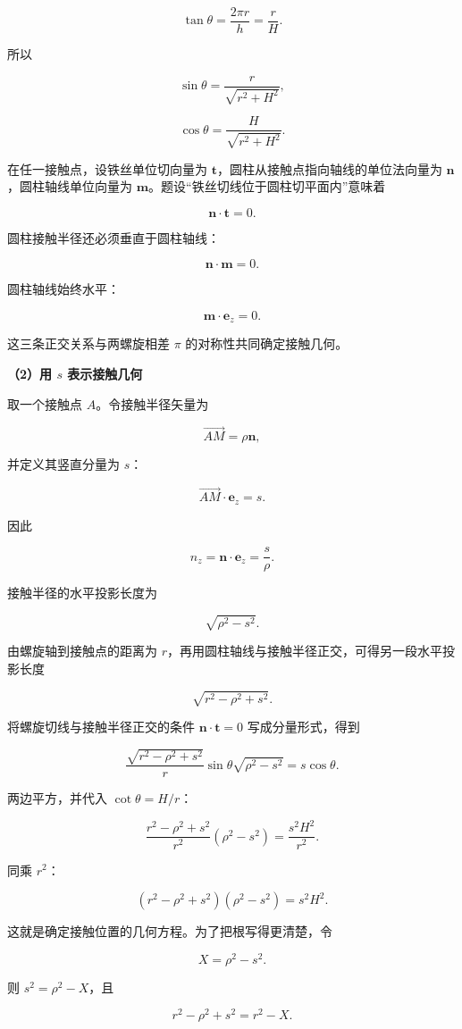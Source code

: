 \documentclass[12pt,a4paper,UTF8]{ctexart}
\begin{document}
\[\tan\theta=\frac{2\pi r}{h}=\frac rH.\]

所以

\[\sin\theta=\frac r{\sqrt{r^2+H^2}},\]

\[\cos\theta=\frac H{\sqrt{r^2+H^2}}.\]

在任一接触点，设铁丝单位切向量为
\(\bm t\)，圆柱从接触点指向轴线的单位法向量为
\(\bm n\)，圆柱轴线单位向量为
\(\bm m\)。题设``铁丝切线位于圆柱切平面内''意味着

\[\bm n\cdot\bm t=0.\]

圆柱接触半径还必须垂直于圆柱轴线：

\[\bm n\cdot\bm m=0.\]

圆柱轴线始终水平：

\[\bm m\cdot\bm e_z=0.\]

这三条正交关系与两螺旋相差 \(\pi\) 的对称性共同确定接触几何。

\textbf{（2）用 \(s\) 表示接触几何}

取一个接触点 \(A\)。令接触半径矢量为

\[\overrightarrow{AM}=\rho\bm n,\]

并定义其竖直分量为 \(s\)：

\[\overrightarrow{AM}\cdot\bm e_z=s.\]

因此

\[n_z=\bm n\cdot\bm e_z=\frac{s}{\rho}.\]

接触半径的水平投影长度为

\[\sqrt{\rho^2-s^2}.\]

由螺旋轴到接触点的距离为
\(r\)，再用圆柱轴线与接触半径正交，可得另一段水平投影长度

\[\sqrt{r^2-\rho^2+s^2}.\]

将螺旋切线与接触半径正交的条件 \(\bm n\cdot\bm t=0\) 写成分量形式，得到

\[\frac{\sqrt{r^2-\rho^2+s^2}}{r}
\sin\theta\sqrt{\rho^2-s^2}
=s\cos\theta.\]

两边平方，并代入 \(\cot\theta=H/r\)：

\[\frac{r^2-\rho^2+s^2}{r^2}(\rho^2-s^2)
=\frac{s^2H^2}{r^2}.\]

同乘 \(r^2\)：

\[\boxed{
(r^2-\rho^2+s^2)(\rho^2-s^2)=s^2H^2
}.\]

这就是确定接触位置的几何方程。为了把根写得更清楚，令

\[X=\rho^2-s^2.\]

则 \(s^2=\rho^2-X\)，且

\[r^2-\rho^2+s^2=r^2-X.\]
\end{document}
